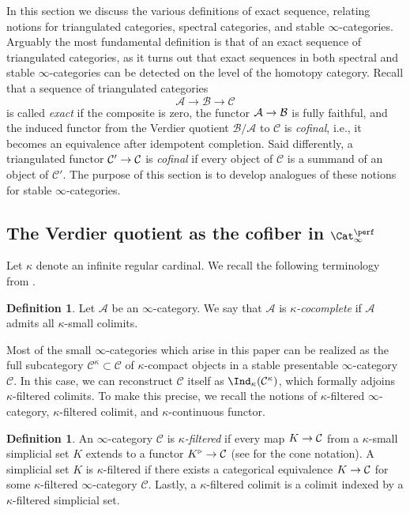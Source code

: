 \documentclass{amsart}
\renewcommand{\to}{\mathchoice{\longrightarrow}{\rightarrow}{\rightarrow}{\rightarrow}}
\let\catsymbfont\mathcal
\newcommand{\aA}{{\catsymbfont{A}}}
\newcommand{\aB}{{\catsymbfont{B}}}
\newcommand{\aC}{{\catsymbfont{C}}}
\newcommand{\idemstabcat}{\Cat_\i^{\perf}}
\newcommand{\too}{\longrightarrow}%
\renewcommand{\i}{\infty}
\numberwithin{equation}{section}
\theoremstyle{definition}
\newtheorem{definition}[equation]{Definition}
\begin{document}
In this section we discuss the various definitions of exact sequence,
relating notions for triangulated categories, spectral categories, and
stable $\i$-categories.  Arguably the most fundamental definition is
that of an exact sequence of triangulated categories, as it turns out
that exact sequences in both spectral and stable $\i$-categories can
be detected on the level of the homotopy category.
Recall that a sequence of triangulated categories
\[
\aA \too \aB \too \aC
\]
is called {\em exact} if the composite is zero, the functor $\aA \to
\aB$ is fully faithful, and the induced functor from the Verdier
quotient $\aB/\aA$ to $\aC$ is {\em cofinal}, i.e., it becomes an
equivalence after idempotent completion.  Said differently, a
triangulated functor $\aC'\to\aC$ is {\em cofinal} if every object of
$\aC$ is a summand of an object of $\aC'$.
The purpose of this section is to develop analogues of these notions
for stable $\i$-categories.  

\subsection{The Verdier quotient as the cofiber in $\idemstabcat$}
Let $\kappa$ denote an infinite regular cardinal.
We recall the
following terminology from \cite[\S 5.3.4]{HTT}.

\begin{definition}
Let $\aA$ be an $\i$-category.
We say that $\aA$ is {\em $\kappa$-cocomplete} if $\aA$ admits all
$\kappa$-small colimits. 
\end{definition}

Most of the small $\i$-categories which arise in this paper can be
realized as the full subcategory $\aC^\kappa\subset\aC$ of
$\kappa$-compact objects in a stable presentable $\i$-category $\aC$.
In this case, we can reconstruct $\aC$ itself as
$\Ind_\kappa(\aC^\kappa)$, which formally adjoins $\kappa$-filtered
colimits.  To make this precise, we recall the notions of
$\kappa$-filtered $\infty$-category, $\kappa$-filtered colimit, and
$\kappa$-continuous functor.

\begin{definition}
An $\i$-category $\aC$ is {\em $\kappa$-filtered} if every map
$K\to\aC$ from a $\kappa$-small simplicial set $K$ extends to a
functor $K^{\triangleright}\to\aC$ (see \cite[2.1.4.2]{HTT}
for the cone notation).  A simplicial set $K$ is $\kappa$-filtered if
there exists a categorical equivalence $K\to\aC$ for some
$\kappa$-filtered $\i$-category $\aC$.  Lastly, a $\kappa$-filtered
colimit is a colimit indexed by a $\kappa$-filtered simplicial set.
\end{definition}
\end{document}
